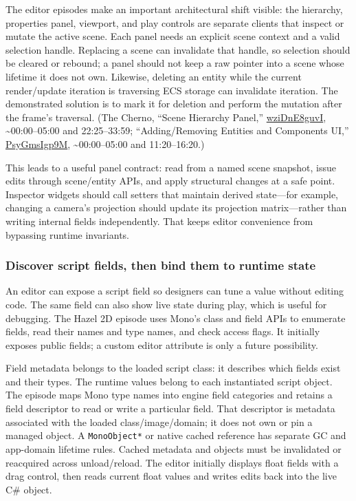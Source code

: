 The editor episodes make an important architectural shift visible: the hierarchy, properties panel, viewport, and play controls are separate clients that inspect or mutate the active scene. Each panel needs an explicit scene context and a valid selection handle. Replacing a scene can invalidate that handle, so selection should be cleared or rebound; a panel should not keep a raw pointer into a scene whose lifetime it does not own. Likewise, deleting an entity while the current render/update iteration is traversing ECS storage can invalidate iteration. The demonstrated solution is to mark it for deletion and perform the mutation after the frame's traversal. (The Cherno, ``Scene Hierarchy Panel,'' \href{https://www.youtube.com/watch?v=wziDnE8guvI}{wziDnE8guvI}, \textasciitilde00:00--05:00 and 22:25--33:59; ``Adding/Removing Entities and Components UI,'' \href{https://www.youtube.com/watch?v=PsyGmsIgp9M}{PsyGmsIgp9M}, \textasciitilde00:00--05:00 and 11:20--16:20.)

This leads to a useful panel contract: read from a named scene snapshot, issue edits through scene/entity APIs, and apply structural changes at a safe point. Inspector widgets should call setters that maintain derived state---for example, changing a camera's projection should update its projection matrix---rather than writing internal fields independently. That keeps editor convenience from bypassing runtime invariants.

\subsubsection{Discover script fields, then bind them to runtime state}\label{06-engine-ii-ch032-discover-script-fields-then-bind-them-to-runtime-state}

\hypertarget{06-engine-ii-ch032-discover-script-fields-then-bind-them-to-runtime-state}{}

An editor can expose a script field so designers can tune a value without editing code. The same field can also show live state during play, which is useful for debugging. The Hazel 2D episode uses Mono's class and field APIs to enumerate fields, read their names and type names, and check access flags. It initially exposes public fields; a custom editor attribute is only a future possibility.

Field metadata belongs to the loaded script class: it describes which fields exist and their types. The runtime values belong to each instantiated script object. The episode maps Mono type names into engine field categories and retains a field descriptor to read or write a particular field. That descriptor is metadata associated with the loaded class/image/domain; it does not own or pin a managed object. A \texttt{MonoObject*} or native cached reference has separate GC and app-domain lifetime rules. Cached metadata and objects must be invalidated or reacquired across unload/reload. The editor initially displays float fields with a drag control, then reads current float values and writes edits back into the live C\# object.

